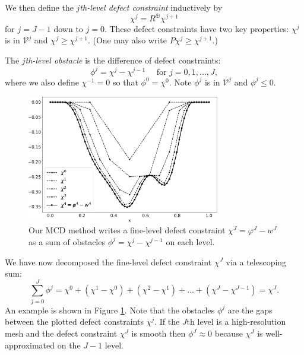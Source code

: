 \documentclass[letterpaper,final,12pt,reqno]{amsart}
\theoremstyle{claim}
\newcommand{\mR}{R^{\bm{\oplus}}}
\numberwithin{equation}{section}
\numberwithin{figure}{section}
\numberwithin{table}{section}
\numberwithin{theorem}{section}
\begin{document}
We then define the \emph{$j$th-level defect constraint} inductively by
\begin{equation}
  \chi^j = \mR \chi^{j+1}  \label{eq:chik}
\end{equation}
for $j=J-1$ down to $j=0$.  These defect constraints have two key properties: $\chi^j$ is in $\mathcal{V}^j$ and $\chi^j \ge \chi^{j+1}$.  (One may also write $P \chi^j \ge \chi^{j+1}$.)

The \emph{$j$th-level obstacle} is the difference of defect constraints:
\begin{equation}
  \phi^j = \chi^j - \chi^{j-1} \quad \text{ for } j=0,1,\dots,J,  \label{eq:levelobstacle}
\end{equation}
where we also define $\chi^{-1}=0$ so that $\phi^0 = \chi^0$.  Note $\phi^j$ is in $\mathcal{V}^j$ and $\phi^j\le 0$.

\begin{figure}
\includegraphics[width=0.75\textwidth]{fixfigs/decomp_defect.pdf}
\caption{Our MCD method writes a fine-level defect constraint $\chi^J = \varphi^J - w^J$ as a sum of obstacles $\phi^j = \chi^j - \chi^{j-1}$ on each level.}
\label{fig:gooddecomposition}
\end{figure}

We have now decomposed the fine-level defect constraint $\chi^J$ via a telescoping sum:
\begin{equation}
  \sum_{j=0}^J \phi^j = \chi^0 + (\chi^1 - \chi^0) + (\chi^2 - \chi^1) + \dots + (\chi^J - \chi^{J-1}) = \chi^J.  \label{eq:telescopingdecomposition}
\end{equation}
An example is shown in Figure \ref{fig:gooddecomposition}.  Note that the obstacles $\phi^j$ are the gaps between the plotted defect constraints $\chi^j$.  If the $J$th level is a high-resolution mesh and the defect constraint $\chi^J$ is smooth then $\phi^J\approx 0$ because $\chi^J$ is well-approximated on the $J-1$ level.
\end{document}
